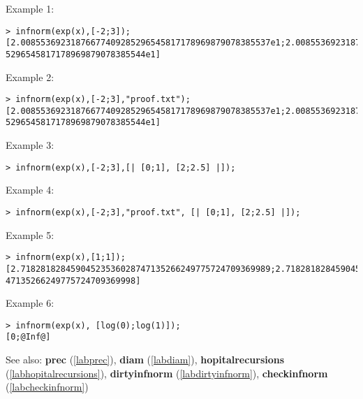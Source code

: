 \noindent Example 1: 
\begin{center}\begin{minipage}{15cm}\begin{Verbatim}[frame=single]
> infnorm(exp(x),[-2;3]);
[2.00855369231876677409285296545817178969879078385537e1;2.0085536923187667740928
5296545817178969879078385544e1]
\end{Verbatim}
\end{minipage}\end{center}
\noindent Example 2: 
\begin{center}\begin{minipage}{15cm}\begin{Verbatim}[frame=single]
> infnorm(exp(x),[-2;3],"proof.txt");
[2.00855369231876677409285296545817178969879078385537e1;2.0085536923187667740928
5296545817178969879078385544e1]
\end{Verbatim}
\end{minipage}\end{center}
\noindent Example 3: 
\begin{center}\begin{minipage}{15cm}\begin{Verbatim}[frame=single]
> infnorm(exp(x),[-2;3],[| [0;1], [2;2.5] |]);
\end{Verbatim}
\end{minipage}\end{center}
\noindent Example 4: 
\begin{center}\begin{minipage}{15cm}\begin{Verbatim}[frame=single]
> infnorm(exp(x),[-2;3],"proof.txt", [| [0;1], [2;2.5] |]);
\end{Verbatim}
\end{minipage}\end{center}
\noindent Example 5: 
\begin{center}\begin{minipage}{15cm}\begin{Verbatim}[frame=single]
> infnorm(exp(x),[1;1]);
[2.71828182845904523536028747135266249775724709369989;2.718281828459045235360287
47135266249775724709369998]
\end{Verbatim}
\end{minipage}\end{center}
\noindent Example 6: 
\begin{center}\begin{minipage}{15cm}\begin{Verbatim}[frame=single]
> infnorm(exp(x), [log(0);log(1)]);
[0;@Inf@]
\end{Verbatim}
\end{minipage}\end{center}
See also: \textbf{prec} (\ref{labprec}), \textbf{diam} (\ref{labdiam}), \textbf{hopitalrecursions} (\ref{labhopitalrecursions}), \textbf{dirtyinfnorm} (\ref{labdirtyinfnorm}), \textbf{checkinfnorm} (\ref{labcheckinfnorm})
